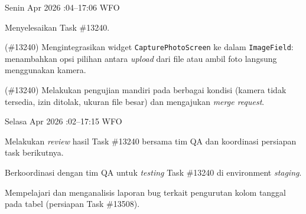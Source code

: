 \begin{logtable}

    {
        Senin  Apr 2026 :04--17:06 \linebreak %
        WFO
    }{
        \begin{loglist}
            \item Menyelesaikan Task \#13240.
        \end{loglist}
    }{
        \begin{logwork}
            \item (\#13240) Mengintegrasikan widget \texttt{CapturePhotoScreen} ke dalam \texttt{ImageField}: menambahkan opsi pilihan antara \textit{upload} dari file atau ambil foto langsung menggunakan kamera.
            \item (\#13240) Melakukan pengujian mandiri pada berbagai kondisi (kamera tidak tersedia, izin ditolak, ukuran file besar) dan mengajukan \textit{merge request}.
        \end{logwork}
    }

    {
        Selasa  Apr 2026 :02--17:15 \linebreak %
        WFO
    }{
        \begin{loglist}
            \item Melakukan \textit{review} hasil Task \#13240 bersama tim QA dan koordinasi
            persiapan task berikutnya.
        \end{loglist}
    }{
        \begin{logwork}
            \item Berkoordinasi dengan tim QA untuk \textit{testing} Task \#13240 di environment
            \textit{staging}.
            \item Mempelajari dan menganalisis laporan bug terkait pengurutan kolom tanggal pada
            tabel (persiapan Task \#13508).
        \end{logwork}
    }


\end{logtable}
